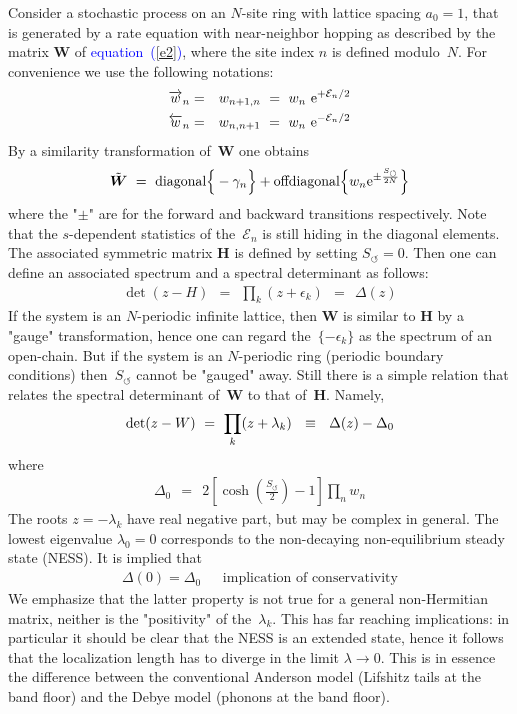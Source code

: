 \documentclass[aps,pre,floats,floatfix,twocolumn]{revtex4}
\newcommand{\eexp}[1]{\mathrm{e}^{#1}}
\newcommand{\ola}{\protect\overleftarrow}
\newcommand{\ora}{\protect\overrightarrow}
\newcommand{\be}[1]{\begin{eqnarray}\ifthenelse{#1=-1}{\nonumber}{\ifthenelse{#1=0}{}{\label{e#1}}}}
\newcommand{\beq}{\begin{eqnarray}}
\newcommand{\eeq}{\end{eqnarray}}
\newcommand{\Eq}[1]{\textcolor{blue}{{equation}\!~(\ref{#1})}}
\begin{document}
Consider a stochastic process on an ${N}$-site ring with lattice spacing $a_0=1$, 
that is generated by a rate equation with near-neighbor hopping 
as described by the matrix $\bm{W}$ of \Eq{e2}, 
where the site index $n$ is defined modulo~$N$. 
For convenience we use the following notations:
%
\beq
\ora{w}_n &=& w_{n+1,n} \ = \ w_n \ \eexp{+\mathcal{E}_n/2} \\
\ola{w}_n &=& w_{n,n+1} \ = \ w_n \ \eexp{-\mathcal{E}_n/2}
\eeq
%
By a similarity transformation of~$\bm{W}$ one obtains
%
\be{16}
\tilde{\bm{W}} \ = \ 
\text{diagonal}\Big\{-\gamma_{n}\Big\} 
+\text{offdiagonal}\Big\{  w_{n}\eexp{\pm \frac{S_{\circlearrowleft}}{2N}}  \Big\}
\eeq
%
where the "$\pm$" are for the forward and backward transitions respectively.
Note that the $s$-dependent statistics of the~$\mathcal{E}_n$ is still hiding in the diagonal elements.
The associated symmetric matrix $\bm{H}$ is defined by setting ${S_{\circlearrowleft}=0}$.
Then one can define an associated spectrum and a spectral determinant as follows:
%
\beq
\det(z-H) \ \ = \ \ \prod_k (z+\epsilon_k) \ \ = \ \ \Delta(z)
\eeq
%
If the system is an ${N}$-periodic infinite lattice, 
then ${\bm{W}}$ is similar to ${\bm{H}}$ by a "gauge" transformation, 
hence one can regard the~${\{-\epsilon_k\}}$ as the spectrum of  an open-chain.
But if the system is an ${N}$-periodic ring (periodic boundary conditions) 
then~$S_{\circlearrowleft}$ cannot be "gauged" away. 
Still there is a simple relation \cite{det1} that relates 
the spectral determinant of~$\bm{W}$ to that of~$\bm{H}$. Namely, 
%
\be{17}
\det(z-W) \ = \  \prod_k (z+\lambda_k)  \ \ \equiv \ \ \Delta(z)-\Delta_0 
\eeq
%
where
%
\beq
\Delta_0 \ \ = \ \ 2\left[\cosh\left(\frac{S_{\circlearrowleft}}{2}\right)-1\right]  \prod_n w_n
\eeq
%
The roots ${z=-\lambda_k}$ have real negative part, but may be complex in general.
The lowest eigenvalue ${\lambda_0=0}$ corresponds to the non-decaying 
non-equilibrium steady state (NESS). It is implied that 
%
\beq
\Delta(0)=\Delta_0 \ \ \ \ \ \ \ \text{implication of conservativity}
\eeq
%
We emphasize that the latter property is not true for a general 
non-Hermitian matrix, neither is the "positivity" of the~${\lambda_k}$.  
This has far reaching implications: in particular it should be 
clear that the NESS is an extended state, hence it follows that 
the localization length has to diverge in the limit ${\lambda\rightarrow0}$.
This is in essence the difference between the 
conventional Anderson model (Lifshitz tails at the band floor) 
and the Debye model (phonons at the band floor).     
\end{document}
